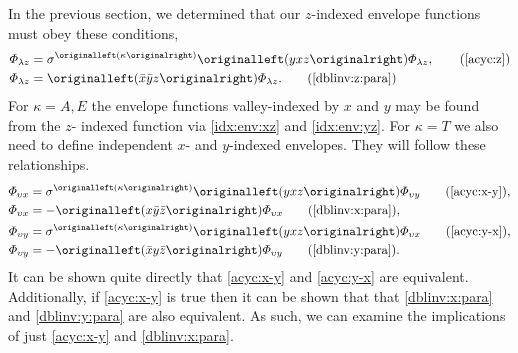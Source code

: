 In the previous section, we determined that our $z$-indexed envelope functions
must obey these conditions,
\begin{align}
  \Phi_{\lambda z}
  & =
  \sigma^{\left(\kappa\right)}\left(yxz\right)\Phi_{\lambda z}
  ,
\tag{\ref{acyc:z}}
\\
  \Phi_{\lambda z}
  & =
  \left(\bar{x}\bar{y}z\right)
  \Phi_{\lambda z}
  .
\tag{\ref{dblinv:z:para}}
\end{align}
For $\kappa = A,E$ the envelope functions valley-indexed by $x$ and $y$ may be
found from the $z$- indexed function via \eqref{idx:env:xz} and
\eqref{idx:env:yz}. For $\kappa = T$ we also need to define independent $x$- and
$y$-indexed envelopes. They will follow these relationships.
\begin{align}
\Phi_{\upsilon x}
  &=
    \sigma^{\left(\kappa\right)}\left(yxz\right)\Phi_{\upsilon y}
\tag{\ref{acyc:x-y}}
,\\
\Phi_{\upsilon x}
  & =
    -
    \left(x\bar{y}\bar{z}\right)
    \Phi_{\upsilon x}
\tag{\ref{dblinv:x:para}}
,\\
\Phi_{\upsilon y}
  &=
    \sigma^{\left(\kappa\right)}\left(yxz\right)\Phi_{\upsilon x}
\tag{\ref{acyc:y-x}}
,\\
\Phi_{\upsilon y}
  & =
    -
    \left(\bar{x}y\bar{z}\right)
    \Phi_{\upsilon y}
\tag{\ref{dblinv:y:para}}
.
\end{align}
It can be shown quite directly that \eqref{acyc:x-y} and \eqref{acyc:y-x} are
equivalent. Additionally, if \eqref{acyc:x-y} is true then it can be shown that
that \eqref{dblinv:x:para} and \eqref{dblinv:y:para} are also equivalent. As
such, we can examine the implications of just \eqref{acyc:x-y} and
\eqref{dblinv:x:para}.

